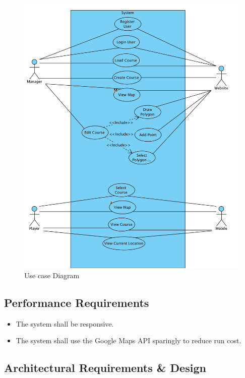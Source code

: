\documentclass{article}
\begin{document}
    \begin{figure}[h]
    \centering
    \includegraphics[scale=0.6]{UsecaseDiagram}
    \caption{Use case Diagram}
    \label{fig:usecase1}
    \end{figure}

    \subsection{Performance Requirements}
    \begin{itemize}
        \item
            The system shall be responsive.
        \item
            The system shall use the Google Maps API sparingly to reduce run
            cost.
    \end{itemize}

    \subsection{Architectural Requirements \& Design}
\end{document}
